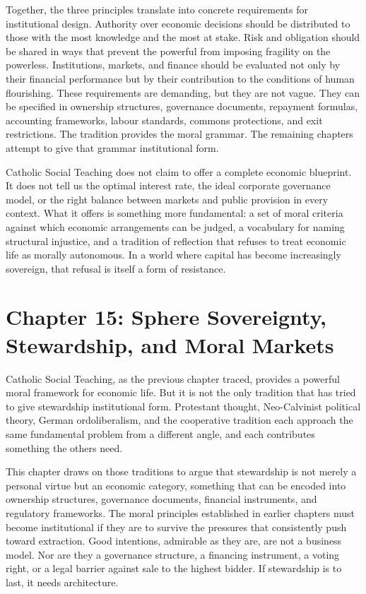 \documentclass[11pt,a4paper,oneside]{book}
\begin{document}
Together, the three principles translate into concrete requirements for institutional design. Authority over economic decisions should be distributed to those with the most knowledge and the most at stake. Risk and obligation should be shared in ways that prevent the powerful from imposing fragility on the powerless. Institutions, markets, and finance should be evaluated not only by their financial performance but by their contribution to the conditions of human flourishing. These requirements are demanding, but they are not vague. They can be specified in ownership structures, governance documents, repayment formulas, accounting frameworks, labour standards, commons protections, and exit restrictions. The tradition provides the moral grammar. The remaining chapters attempt to give that grammar institutional form.

Catholic Social Teaching does not claim to offer a complete economic blueprint. It does not tell us the optimal interest rate, the ideal corporate governance model, or the right balance between markets and public provision in every context. What it offers is something more fundamental: a set of moral criteria against which economic arrangements can be judged, a vocabulary for naming structural injustice, and a tradition of reflection that refuses to treat economic life as morally autonomous. In a world where capital has become increasingly sovereign, that refusal is itself a form of resistance.

\chapter*{Chapter 15: Sphere Sovereignty, Stewardship, and Moral Markets}

Catholic Social Teaching, as the previous chapter traced, provides a powerful moral framework for economic life. But it is not the only tradition that has tried to give stewardship institutional form. Protestant thought, Neo-Calvinist political theory, German ordoliberalism, and the cooperative tradition each approach the same fundamental problem from a different angle, and each contributes something the others need.

This chapter draws on those traditions to argue that stewardship is not merely a personal virtue but an economic category, something that can be encoded into ownership structures, governance documents, financial instruments, and regulatory frameworks. The moral principles established in earlier chapters must become institutional if they are to survive the pressures that consistently push toward extraction. Good intentions, admirable as they are, are not a business model. Nor are they a governance structure, a financing instrument, a voting right, or a legal barrier against sale to the highest bidder. If stewardship is to last, it needs architecture.
\end{document}
